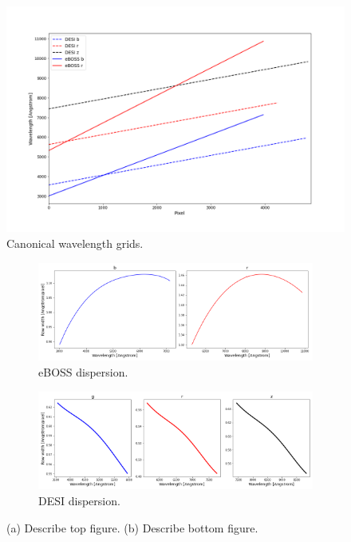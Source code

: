 \begin{figure}[h]
\centering
\includegraphics[width=14cm]{images/specsim/canonical_grid.png}
\caption{Canonical wavelength grids.}
\label{fig:canonical}
\end{figure}

\begin{figure}[h]
\centering
\begin{subfigure}[b]{0.55\textwidth}
   \includegraphics[width=14cm]{images/specsim/eboss_row_width.png}
   \caption{eBOSS dispersion.}
   \label{fig:eboss_disp} 
\end{subfigure}

\begin{subfigure}[b]{0.55\textwidth}
   \includegraphics[width=14cm]{images/specsim/desi_row_width.png}
   \caption{DESI dispersion.}
   \label{fig:desi_disp}
\end{subfigure}
\caption[Two numerical solutions]{(a) Describe top figure. (b) Describe bottom figure.}
\label{fig:disp}
\end{figure}

